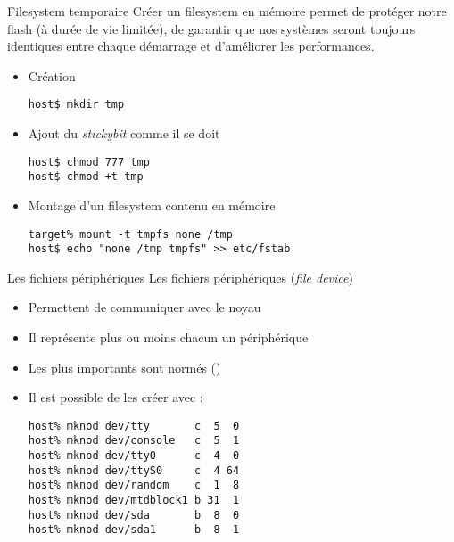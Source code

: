 \begin{frame}[fragile=singleslide]{Filesystem temporaire}
  Créer un  filesystem en  mémoire permet de  protéger notre  flash (à
  durée  de vie  limitée), de  garantir que  nos systèmes  seront toujours
  identiques entre chaque démarrage et d'améliorer les performances.
  \begin{itemize}
    \item Création
    \begin{lstlisting}
host$ mkdir tmp
    \end{lstlisting}
  \item Ajout du \emph{stickybit} comme il se doit
    \begin{lstlisting}
host$ chmod 777 tmp
host$ chmod +t tmp
    \end{lstlisting}
  \item Montage d'un filesystem contenu en mémoire
    \begin{lstlisting}
target% mount -t tmpfs none /tmp
host$ echo "none /tmp tmpfs" >> etc/fstab
    \end{lstlisting}
  \end{itemize}
\end{frame}

\begin{frame}[fragile=singleslide]{Les fichiers périphériques}
  Les fichiers périphériques (\emph{file device})
  \begin{itemize}
  \item Permettent de communiquer avec le noyau
  \item Il représente plus ou moins chacun un périphérique
  \item       Les       plus        importants       sont       normés
    ()
  \item Il est possible de les créer avec :
    \begin{lstlisting}
host% mknod dev/tty       c  5  0
host% mknod dev/console   c  5  1
host% mknod dev/tty0      c  4  0
host% mknod dev/ttyS0     c  4 64
host% mknod dev/random    c  1  8
host% mknod dev/mtdblock1 b 31  1
host% mknod dev/sda       b  8  0
host% mknod dev/sda1      b  8  1
    \end{lstlisting}
  \end{itemize}
\end{frame}

